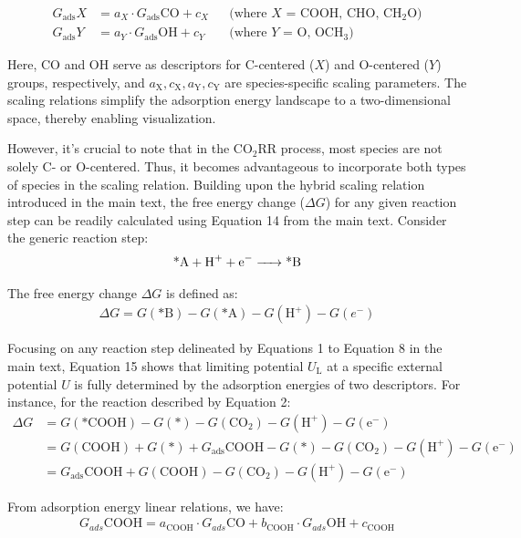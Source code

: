 \begin{align}
  G_{\text{ads}}X &= a_X \cdot G_{\text{ads}}{\text{CO}} + c_X  && \text{(where  $X$ = COOH, CHO, CH$_2$O)} \\
  G_{\text{ads}}Y &= a_Y \cdot G_{\text{ads}}{\text{OH}} + c_Y  && \text{(where  $Y$ = O, OCH$_3$)}
\end{align}

Here, CO and OH serve as descriptors for C-centered ($X$) and O-centered ($Y$) groups, respectively, and $a_{\mathrm{X}}, c_{\mathrm{X}}, a_{\mathrm{Y}}, c_{\mathrm{Y}}$ are species-specific scaling parameters.
The scaling relations simplify the adsorption energy landscape to a two-dimensional space, thereby enabling visualization.

However, it's crucial to note that in the CO$_2$RR process, most species are not solely C- or O-centered.
Thus, it becomes advantageous to incorporate both types of species in the scaling relation.
Building upon the hybrid scaling relation introduced in the main text, the free energy change ($\Delta\mathit{G}$) for any given reaction step can be readily calculated using Equation 14 from the main text.
Consider the generic reaction step:
\begin{align}
  \ce{\text{*}A + H+ + e- -> \text{*}B}
\end{align}

The free energy change $\Delta\mathit{G}$ is defined as:
\begin{align}
  \Delta G = G(\text{*}\mathrm{B}) - G(\text{*}\mathrm{A}) - G(\mathrm{H}^+) - G(e^-)
\end{align}

Focusing on any reaction step delineated by Equations 1 to Equation 8 in the main text,
Equation 15 shows that limiting potential $U_{\mathrm{L}}$ at a specific external potential $U$ is fully determined by the adsorption energies of two descriptors.
For instance, for the reaction described by Equation 2:
\begin{align}
  \Delta G &= G(\text{*COOH}) - G(\text{*}) - G(\text{CO}_2) - G(\text{H}^+) - G(\text{e}^-) \\
  &= G(\text{COOH}) + G(\text{*}) + G_{\text{ads}}\text{COOH} - G(\text{*}) - G(\text{CO}_2) -G(\text{H}^+) - G(\text{e}^-) \\
  &= G_{\text{ads}}\text{COOH} + G(\text{COOH}) - G(\text{CO}_2) -G(\text{H}^+) - G(\text{e}^-)
\end{align}

From adsorption energy linear relations, we have:
\begin{align}
  G_{ads}{\mathrm{COOH}} = a_{\text{COOH}} \cdot G_{ads}{\mathrm{CO}} + b_{\text{COOH}} \cdot G_{ads}{\mathrm{OH}} + c_{\text{COOH}}
\end{align}

